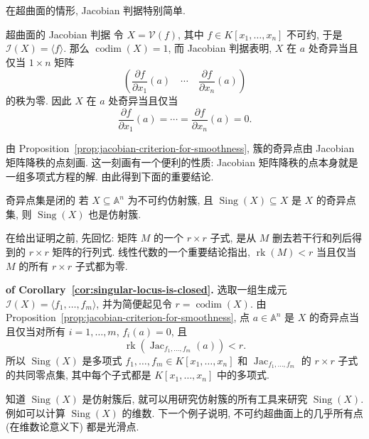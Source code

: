 在超曲面的情形, Jacobian 判据特别简单.

\begin{Example}{超曲面的 Jacobian 判据}\leavevmode\label{ex:jacobian-criterion-for-hypersurfaces}
令 $X=\mathcal{V}(f)$, 其中 $f\in K[x_{1},\ldots,x_{n}]$ 不可约, 于是 $\mathcal{I}(X)=\langle f\rangle$. 那么 $\operatorname{codim}(X)=1$, 而 Jacobian 判据表明, $X$ 在 $a$ 处奇异当且仅当 $1\times n$ 矩阵
\[
  \left(\frac{\partial f}{\partial x_{1}}(a)\quad\cdots\quad
    \frac{\partial f}{\partial x_{n}}(a)\right)
\]
的秩为零. 因此 $X$ 在 $a$ 处奇异当且仅当
\[
  \frac{\partial f}{\partial x_{1}}(a)=\cdots=\frac{\partial f}{\partial x_{n}}(a)=0.
\]
\end{Example}

由 Proposition~\ref{prop:jacobian-criterion-for-smoothness}, 簇的奇异点由 Jacobian 矩阵降秩的点刻画. 这一刻画有一个便利的性质: Jacobian 矩阵降秩的点本身就是一组多项式方程的解. 由此得到下面的重要结论.

\begin{Corollary}{奇异点集是闭的}\leavevmode\label{cor:singular-locus-is-closed}
若 $X\subseteq\mathbb{A}^{n}$ 为不可约仿射簇, 且 $\operatorname{Sing}(X)\subseteq X$ 是 $X$ 的奇异点集, 则 $\operatorname{Sing}(X)$ 也是仿射簇.
\end{Corollary}

在给出证明之前, 先回忆: 矩阵 $M$ 的一个 $r\times r$ 子式, 是从 $M$ 删去若干行和列后得到的 $r\times r$ 矩阵的行列式. 线性代数的一个重要结论指出, $\operatorname{rk}(M)<r$ 当且仅当 $M$ 的所有 $r\times r$ 子式都为零.

\begin{Proof}\textbf{of Corollary~\ref{cor:singular-locus-is-closed}.}\quad
选取一组生成元 $\mathcal{I}(X)=\langle f_{1},\ldots,f_{m}\rangle$, 并为简便起见令 $r=\operatorname{codim}(X)$. 由 Proposition~\ref{prop:jacobian-criterion-for-smoothness}, 点 $a\in\mathbb{A}^{n}$ 是 $X$ 的奇异点当且仅当对所有 $i=1,\ldots,m$, $f_{i}(a)=0$, 且
\[
  \operatorname{rk}(\operatorname{Jac}_{f_{1},\ldots,f_{m}}(a))<r.
\]
所以 $\operatorname{Sing}(X)$ 是多项式 $f_{1},\ldots,f_{m}\in K[x_{1},\ldots,x_{n}]$ 和 $\operatorname{Jac}_{f_{1},\ldots,f_{m}}$ 的 $r\times r$ 子式的共同零点集, 其中每个子式都是 $K[x_{1},\ldots,x_{n}]$ 中的多项式.
\end{Proof}

知道 $\operatorname{Sing}(X)$ 是仿射簇后, 就可以用研究仿射簇的所有工具来研究 $\operatorname{Sing}(X)$. 例如可以计算 $\operatorname{Sing}(X)$ 的维数. 下一个例子说明, 不可约超曲面上的\textquotedbl{}几乎所有点\textquotedbl{} (在维数论意义下) 都是光滑点.

